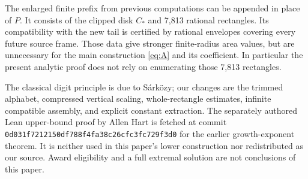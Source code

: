 \documentclass[11pt,a4paper]{article}
\theoremstyle{remark}\newtheorem{remark}[theorem]{Remark}
\begin{document}
The enlarged finite prefix from previous computations can be appended in
place of $P$. It consists of the clipped disk $C_*$ and 7,813 rational
rectangles. Its compatibility with the new tail is certified by rational
envelopes covering every future source frame. Those data give stronger
finite-radius area values, but are unnecessary for the main construction
\eqref{eq:A} and its coefficient. In particular the present analytic proof
does not rely on enumerating those 7,813 rectangles.

The classical digit principle is due to S\'ark\"ozy; our changes are the
trimmed alphabet, compressed vertical scaling, whole-rectangle estimates,
infinite compatible assembly, and explicit constant extraction.
The separately authored Lean upper-bound proof by Allen Hart is fetched
at commit \texttt{0d031f7212150df788f4f}\allowbreak\texttt{a38c26cfc3fc729f3d0} for the
earlier growth-exponent theorem. It is neither used in this paper's lower
construction nor redistributed as our source. Award eligibility and a
full extremal solution are not conclusions of this paper.

\appendix
\end{document}
